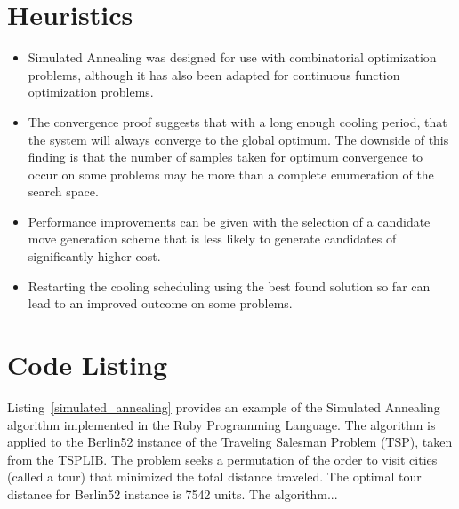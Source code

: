 \documentclass[a4paper, 11pt]{article}
\begin{document}
\section{Heuristics}
\label{sec:heuristics}
\begin{itemize}
	\item Simulated Annealing was designed for use with combinatorial optimization problems, although it has also been adapted for continuous function optimization problems.
	\item The convergence proof suggests that with a long enough cooling period, that the system will always converge to the global optimum. The downside of this finding is that the number of samples taken for optimum convergence to occur on some problems may be more than a complete enumeration of the search space. 
	\item Performance improvements can be given with the selection of a candidate move generation scheme that is less likely to generate candidates of significantly higher cost.
	\item Restarting the cooling scheduling using the best found solution so far can lead to an improved outcome on some problems.
\end{itemize}

\section{Code Listing}
\label{sec:code}
Listing~\ref{simulated_annealing} provides an example of the Simulated Annealing algorithm implemented in the Ruby Programming Language. 
The algorithm is applied to the Berlin52 instance of the Traveling Salesman Problem (TSP), taken from the TSPLIB. The problem seeks a permutation of the order to visit cities (called a tour) that minimized the total distance traveled. The optimal tour distance for Berlin52 instance is 7542 units.
The algorithm...
\end{document}
